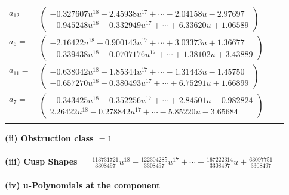 \documentclass[1p]{elsarticle_modified}
\theoremstyle{definition}
\begin{document}
\begin{tabular}{m{7pt} m{180pt} m{7pt} m{180pt} }
\flushright $a_{12}=$&$\begin{pmatrix}-0.327607 u^{18}+2.45938 u^{17}+\cdots-2.04158 u-2.97697\\-0.945248 u^{18}+0.332949 u^{17}+\cdots+6.33620 u+1.06589\end{pmatrix}$ \\
\flushright $a_{6}=$&$\begin{pmatrix}-2.16422 u^{18}+0.900143 u^{17}+\cdots+3.03373 u+1.36677\\-0.339438 u^{18}+0.0707176 u^{17}+\cdots+1.38102 u+3.43889\end{pmatrix}$ \\
\flushright $a_{11}=$&$\begin{pmatrix}-0.638042 u^{18}+1.85344 u^{17}+\cdots-1.31443 u-1.45750\\-0.657270 u^{18}-0.380493 u^{17}+\cdots+6.75291 u+1.66899\end{pmatrix}$ \\
\flushright $a_{7}=$&$\begin{pmatrix}-0.343425 u^{18}-0.352256 u^{17}+\cdots+2.84501 u-0.982824\\2.26422 u^{18}-0.278842 u^{17}+\cdots-5.85220 u-3.65684\end{pmatrix}$\\&\end{tabular}
\flushleft \textbf{(ii) Obstruction class $= 1$}\\~\\
\flushleft \textbf{(iii) Cusp Shapes $= \frac{113731721}{3308497} u^{18}-\frac{122304285}{3308497} u^{17}+\cdots-\frac{167222314}{3308497} u+\frac{63097751}{3308497}$}\\~\\
\newpage\renewcommand{\arraystretch}{1}
\flushleft \textbf{(iv) u-Polynomials at the component}\newline \\
\end{document}
